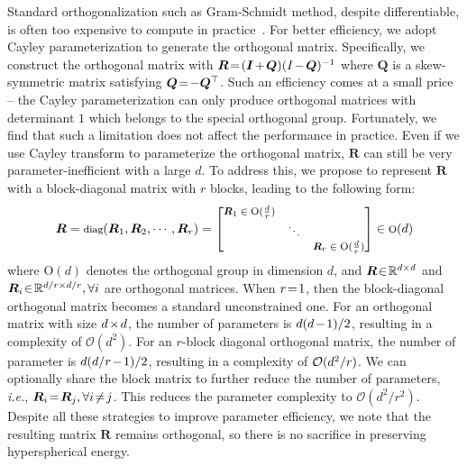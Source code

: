 \documentclass{article}
\newcommand{\ie}{\emph{i.e.}}
\begin{document}
Standard orthogonalization such as Gram-Schmidt method, despite differentiable, is often too expensive to compute in practice~\cite{liu2021orthogonal}. For better efficiency, we adopt Cayley parameterization to generate the orthogonal matrix. Specifically, we construct the orthogonal matrix with $\thickmuskip=2mu \medmuskip=2mu \bm{R}=(\bm{I}+\bm{Q})(I-\bm{Q})^{-1}$ where $\bm{Q}$ is a skew-symmetric matrix satisfying $\thickmuskip=2mu \medmuskip=2mu \bm{Q}=-\bm{Q}^\top$. Such an efficiency comes at a small price -- the Cayley parameterization can only produce orthogonal matrices with determinant $1$ which belongs to the special orthogonal group. Fortunately, we find that such a limitation does not affect the performance in practice. Even if we use Cayley transform to parameterize the orthogonal matrix, $\bm{R}$ can still be very parameter-inefficient with a large $d$. To address this, we propose to represent $\bm{R}$ with a block-diagonal matrix with $r$ blocks, leading to the following form:
\begin{equation}
    \footnotesize
    \bm{R}=\text{diag}(\bm{R}_1,\bm{R}_2,\cdots,\bm{R}_r)=\begin{bmatrix}
    \bm{R}_1\in \text{O}(\frac{d}{r}) &  &\\
    &\ddots & \\
    & & \bm{R}_r\in \text{O}(\frac{d}{r})
    \end{bmatrix}\in \text{O}(d)
\end{equation}
where $\text{O}(d)$ denotes the orthogonal group in dimension $d$, and $\thickmuskip=2mu \medmuskip=2mu \bm{R}\in\mathbb{R}^{d\times d}$ and $\thickmuskip=2mu \medmuskip=2mu \bm{R}_i\in\mathbb{R}^{d/r\times d/r},\forall i$ are orthogonal matrices. When $\thickmuskip=2mu \medmuskip=2mu r=1$, then the block-diagonal orthogonal matrix becomes a standard unconstrained one. For an orthogonal matrix with size $\thickmuskip=2mu \medmuskip=2mu d\times d$, the number of parameters is $\thickmuskip=2mu \medmuskip=2mu d(d-1)/2$, resulting in a complexity of $\mathcal{O}(d^2)$. For an $r$-block diagonal orthogonal matrix, the number of parameter is $\thickmuskip=2mu \medmuskip=2mu d(d/r-1)/2$, resulting in a complexity of $\thickmuskip=2mu \medmuskip=2mu \mathcal{O}(d^2/r)$. We can optionally share the block matrix to further reduce the number of parameters, \ie, $\thickmuskip=2mu \medmuskip=2mu\bm{R}_i=\bm{R}_j,\forall i\neq j$. This reduces the parameter complexity to $\mathcal{O}(d^2/r^2)$.  Despite all these strategies to improve parameter efficiency, we note that the resulting matrix $\bm{R}$ remains orthogonal, so there is no sacrifice in preserving hyperspherical energy.
\end{document}
